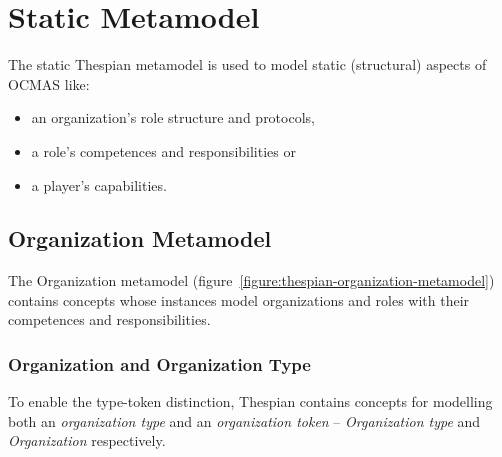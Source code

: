 
\section{Static Metamodel}

The static Thespian metamodel is used to model static (structural) aspects of OCMAS like:
\begin{itemize}
	\item an organization's role structure and protocols,
	\item a role's competences and responsibilities or
	\item a player's capabilities.
\end{itemize}

\subsection{Organization Metamodel}

The Organization metamodel (figure~\ref{figure:thespian-organization-metamodel}) contains concepts whose instances model organizations and roles with their competences and responsibilities.

\subsubsection*{Organization and Organization Type}

To enable the type-token distinction, Thespian contains concepts for modelling both an \textit{organization type} and an \textit{organization token} -- \textit{Organization type} and \textit{Organization} respectively.

